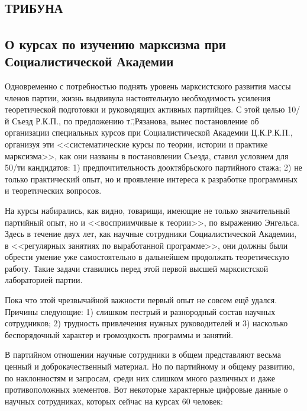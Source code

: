 \section*{\textsc{трибуна}}
\label{sec:9}

\subsection*{О курсах по изучению марксизма при Социалистической Академии}
\label{subsec:9.1}

Одновременно с потребностью поднять уровень марксистского развития массы членов партии, жизнь выдвивула настоятельную необходимость усиления теоретической подготовки и руководящих активных партийцев. С этой целью 10\-/й Съезд Р.К.П., по предложению т.\=,Рязанова, вынес постановление об организации специальных курсов при Социалистической Академии Ц.К.Р.К.П., организуя эти <<систематические курсы по теории, истории и практике марксизма>>, как они названы в постановлении Съезда, ставил условием для 50\-/ти кандидатов: 1) предпочтительность дооктябрьского партийного стажа; 2) не только практический опыт, но и проявление интереса к разработке программных и теоретических вопросов.

На курсы набирались, как видно, товарищи, имеющие не только значительный партийный опыт, но и <<восприимчивые к теории>>, по выражению Энгельса. Здесь в течение двух лет, как научные сотрудники Социалистической Академии, в <<регулярных занятиях по выработанной программе>>, они должны были обрести умение уже самостоятельно в дальнейшем продолжать теоретическую работу. Такие задачи ставились перед этой первой высшей марксистской лабораторией партии.

Пока что этой чрезвычайной важности первый опыт не совсем ещё удался. Причины следующие: 1) слишком пестрый и разнородный состав научных сотрудников; 2) трудность привлечения нужных руководителей и 3) насколько беспорядочный характер и громоздкость программы и занятий.

В партийном отношении научные сотрудники в общем представляют весьма ценный и доброкачественный материал. Но по партийному и общему развитию, по наклонностям и запросам, среди них слишком много различных и даже противоположных элементов. Вот некоторые характерные цифровые данные о научных сотрудниках, которых сейчас на курсах 60 человек:


